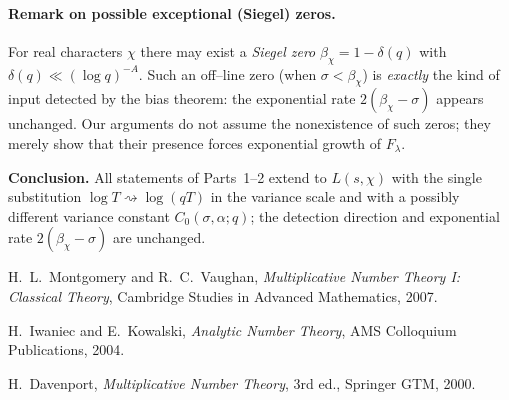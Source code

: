 \paragraph{Remark on possible exceptional (Siegel) zeros.}
For real characters $\chi$ there may exist a \emph{Siegel zero}
$\beta_\chi=1-\delta(q)$ with $\delta(q)\ll (\log q)^{-A}$. Such an off–line zero
(when $\sigma<\beta_\chi$) is \emph{exactly} the kind of input detected by the
bias theorem: the exponential rate $2(\beta_\chi-\sigma)$ appears unchanged.
Our arguments do not assume the nonexistence of such zeros; they merely show that
their presence forces exponential growth of $F_\lambda$.

\medskip
\noindent
\textbf{Conclusion.}
All statements of Parts~1–2 extend to $L(s,\chi)$ with the single substitution
$\log T\rightsquigarrow \log(qT)$ in the variance scale and with a possibly different
variance constant $C_0(\sigma,\alpha;q)$; the detection direction and exponential
rate $2(\beta_\chi-\sigma)$ are unchanged.

\medskip
\begin{thebibliography}{9}
\setlength{\itemsep}{2pt}
H.~L.~Montgomery and R.~C.~Vaughan,
\emph{Multiplicative Number Theory I: Classical Theory},
Cambridge Studies in Advanced Mathematics, 2007.

H.~Iwaniec and E.~Kowalski,
\emph{Analytic Number Theory},
AMS Colloquium Publications, 2004.

H.~Davenport,
\emph{Multiplicative Number Theory}, 3rd ed., Springer GTM, 2000.
\end{thebibliography}

